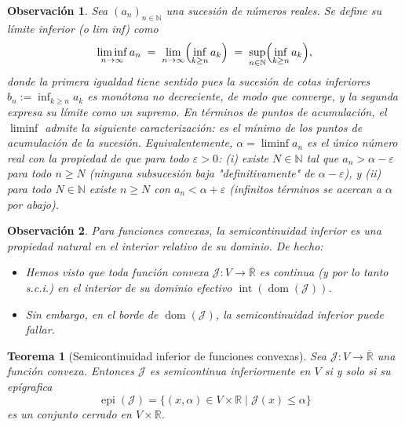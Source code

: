 \documentclass[12pt]{book}
\newtheorem{theorem}{Teorema}
\newtheorem{remark}{Observación}
\newcommand{\dom}{\operatorname{dom}}
\theoremstyle{definition}
\theoremstyle{plain}
\theoremstyle{remark}
\begin{document}
\begin{remark} 
Sea $(a_n)_{n\in\mathbb{N}}$ una sucesión de números reales. Se define su
\emph{límite inferior} (o \emph{lim inf}) como
\[
  \liminf_{n\to\infty} a_n \;=\; \lim_{n\to\infty}\Bigl(\inf_{k\ge n} a_k\Bigr)
  \;=\; \sup_{n\in\mathbb{N}}\Bigl(\inf_{k\ge n} a_k\Bigr),
\]
donde la primera igualdad tiene sentido pues la sucesión de cotas inferiores
$b_n:=\inf_{k\ge n} a_k$ es monótona no decreciente, de modo que
converge, y la segunda expresa su límite como un supremo. En términos de puntos
de acumulación, el $\liminf$ admite la siguiente caracterización: es el
\emph{mínimo} de los puntos de acumulación de la sucesión. 
Equivalentemente, $\alpha=\liminf a_n$ es el único número real con la propiedad de
que para todo $\varepsilon>0$: (i) existe $N\in\mathbb{N}$ tal que $a_n>\alpha-\varepsilon$
para todo $n\ge N$ (ninguna subsucesión baja "definitivamente" de
$\alpha-\varepsilon$), y (ii) para todo $N\in\mathbb{N}$ existe $n\ge N$ con
$a_n<\alpha+\varepsilon$ (infinitos términos se acercan a $\alpha$ por abajo).
\end{remark}

\begin{remark} 
    Para funciones convexas, la semicontinuidad inferior es una propiedad {natural} en el {interior relativo} de su dominio. De hecho:
    \begin{itemize}
        \item Hemos visto que toda función convexa $\mathcal{J}: V \to \overline{\mathbb{R}}$ es {continua} (y por lo tanto s.c.i.) en el {interior de su dominio efectivo} $\operatorname{int}(\dom(\mathcal{J}))$.
        \item Sin embargo, en el {borde} de $\dom(\mathcal{J})$, la semicontinuidad inferior {puede fallar}.
    \end{itemize}
\end{remark}

\begin{theorem}[Semicontinuidad inferior de funciones convexas]
    Sea $\mathcal{J}: V %
    \to \overline{\mathbb{R}}$ una función convexa. Entonces
        $\mathcal{J}$ es {semicontinua inferiormente} en $V$ si y solo si su {epígrafica}
        \[
        \operatorname{epi}(\mathcal{J}) = \{(x, \alpha) \in V \times \mathbb{R} \mid \mathcal{J}(x) \leq \alpha\}
        \]
        es un conjunto {cerrado} en $V %
        \times \mathbb{R}$.
\end{theorem}
\end{document}
